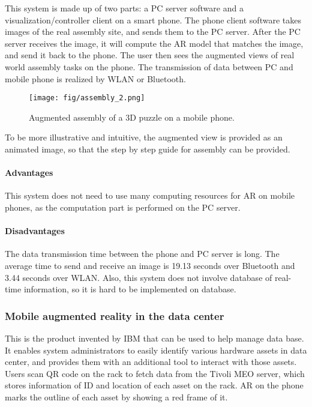 \documentclass[11pt,a4paper]{article}
\begin{document}
\begin{onehalfspace}
This system is made up of two parts: a PC server software and a visualization/controller client on a smart phone. The phone client software takes images of the real assembly site, and sends them to the PC server. After the PC server receives the image, it will compute the AR model that matches the image, and send it back to the phone. The user then sees the augmented views of real world assembly tasks on the phone. The transmission of data between PC and mobile phone is realized by WLAN or Bluetooth.

\begin{figure}[H]
    \centering
    \texttt{[image: fig/assembly\_2.png]}
    \caption{Augmented assembly of a 3D puzzle on a mobile phone.}
    \label{fig:assembly2}
\end{figure}
To be more illustrative and intuitive, the augmented view is provided as an animated image, so that the step by step guide for assembly can be provided.

\paragraph{Advantages} This system does not need to use many computing resources for AR on mobile phones, as the computation part is performed on the PC server.

\paragraph{Disadvantages}
The data transmission time between the phone and PC server is long. The average time to send and receive an image is 19.13 seconds over Bluetooth and 3.44 seconds over WLAN. Also, this system does not involve database of real-time information, so it is hard to be implemented on database.


\subsubsection{Mobile augmented reality in the data center~\cite{arIBM}}
This is the product invented by IBM that can be used to help manage data base. It enables system administrators to easily identify various hardware assets in data center, and provides them with an additional tool to interact with those assets. Users scan QR code on the rack to fetch data from the Tivoli MEO server, which stores information of ID and location of each asset on the rack. AR on the phone marks the outline of each asset by showing a red frame of it.


\end{onehalfspace}
\end{document}
